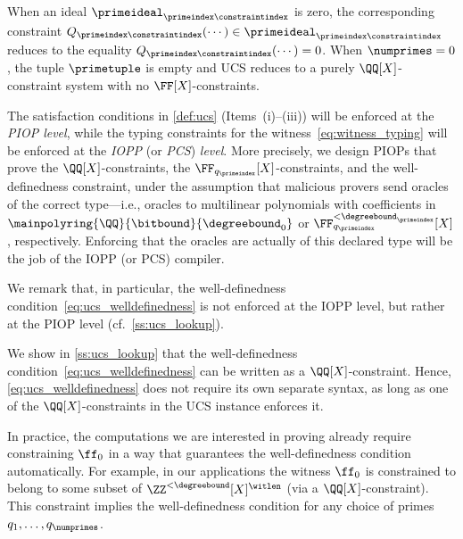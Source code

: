 When an ideal $\primeideal_{\primeindex\constraintindex}$ is zero, the corresponding constraint
$Q_{\primeindex\constraintindex}(\cdots)\in\primeideal_{\primeindex\constraintindex}$ reduces to the
equality $Q_{\primeindex\constraintindex}(\cdots)=0$. When $\numprimes=0$, the tuple $\primetuple$ is empty and UCS reduces to a purely $\QQ[X]$-constraint system with no $\FF[X]$-constraints.

\begin{remark}
\label{rem:piop_iopp_separation}
The satisfaction conditions in \cref{def:ucs} (Items~(i)--(iii)) will be enforced at the \emph{PIOP level}, while the typing constraints for the witness~\eqref{eq:witness_typing} will be enforced at the \emph{IOPP} (or \emph{PCS}) \emph{level}.
More precisely, we design PIOPs that prove the $\QQ[X]$-constraints, the $\FF_{q_\primeindex}[X]$-constraints, and the well-definedness constraint, under the assumption that malicious provers send oracles of the correct type---i.e., oracles to multilinear polynomials with coefficients in $\mainpolyring{\QQ}{\bitbound}{\degreebound_0}$ or $\FF_{q_\primeindex}^{<\degreebound_\primeindex}[X]$, respectively. 
Enforcing that the oracles are actually of this declared type will be the job of the IOPP (or PCS) compiler. 

We remark that, in particular, the well-definedness condition~\eqref{eq:ucs_welldefinedness} is not enforced at the IOPP level, but rather at the PIOP level (cf.\ \cref{ss:ucs_lookup}).
\end{remark}

\begin{remark}
  We show in \cref{ss:ucs_lookup} that the well-definedness condition~\eqref{eq:ucs_welldefinedness} can be written as a $\QQ[X]$-constraint. Hence, \eqref{eq:ucs_welldefinedness} does not require its own separate syntax, as long as one of the $\QQ[X]$-constraints in the UCS instance enforces it.  

In practice, the computations we are interested in proving already require constraining $\ff_0$ in a way that guarantees the well-definedness condition automatically. For example, in our applications the witness $\ff_0$ is constrained to belong to some subset of $\ZZ^{<\degreebound}[X]^\witlen$ (via a $\QQ[X]$-constraint). This constraint implies the well-definedness condition for any choice of primes $q_1,\ldots,q_{\numprimes}$.
\end{remark}

